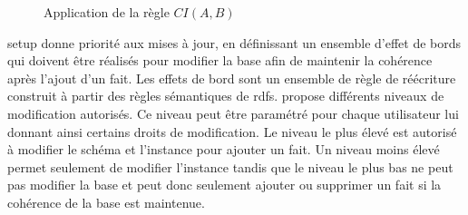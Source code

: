 \begin{figure}[ht]
    \centering
    \begin{subfigure}[b]{.45\textwidth}
        \centering
    \end{subfigure}
    \raisebox{1.5cm}{\scalebox{1.5}{$\longrightarrow$}}
    \begin{subfigure}[b]{.45\textwidth}
        \centering
    \end{subfigure}
    \caption{Application de la règle $CI(A,B)$}
    \label{fig:rule_ci}
\end{figure}

\gls{setup} donne priorité aux mises à jour, en définissant un ensemble d'effet de bords qui doivent être réalisés pour modifier la base afin de maintenir la cohérence après l'ajout d'un fait.
Les effets de bord sont un ensemble de règle de réécriture construit à partir des règles sémantiques de \gls{rdfs}.
\cite{chabinUsingGraphGrammar2019} propose différents niveaux de modification autorisés.
Ce niveau peut être paramétré pour chaque utilisateur lui donnant ainsi certains droits de modification.
Le niveau le plus élevé est autorisé à modifier le schéma et l'instance pour ajouter un fait.
Un niveau moins élevé permet seulement de modifier l'instance tandis que le niveau le plus bas ne peut pas modifier la base et peut donc seulement ajouter ou supprimer un fait si la cohérence de la base est maintenue.

